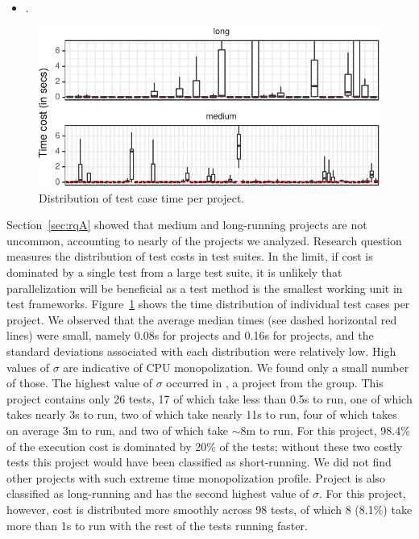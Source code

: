 \begin{itemize}
  \item \numRQFeasibilityTwo. \textbf{\RQFeasibilityTwo}
\end{itemize}

\begin{figure}[t!]
  \centering
  \includegraphics[width=.48\textwidth]{results/testcost-distribution.pdf}
  \vspace{-2mm}
  \caption{\label{fig:time-distributions}Distribution of test case time per project.}%
  \vspace{-5mm}
\end{figure}

Section~\ref{sec:rqA} showed that medium and long-running projects are
not uncommon, accounting to nearly \percentMedLongRunning{} of the
\numSubjs{} projects we analyzed.  Research question \numRQFeasibilityTwo{}
measures the distribution of test costs in test suites.  In
the limit, if cost is dominated by a single test from a large test
suite, it is unlikely that parallelization will be beneficial as a
test method is the smallest working unit in test frameworks.
Figure~\ref{fig:time-distributions} shows the time distribution of
individual test cases per project.
We observed that the average median times (see dashed horizontal red
lines) were small, namely 0.08s
for \medg{} projects and 0.16s for \longg{} projects, and the standard deviations associated with each distribution were
relatively low. High values of
$\sigma$ are indicative of CPU monopolization. We found only a small number
of those. The highest value of $\sigma$ occurred in
, a project from the \longg{} group.
This project contains only 26 tests, 17 of which take less than 0.5s
to run, one of which takes nearly 3s to run, two of which take nearly
11s to run, four of which takes on average 3m to run, and two of which
take $\sim$8m to run.
For this project, 98.4\% of the execution cost is dominated by 20\% of
the tests; without these two costly tests this project would have been
classified as short-running.
We did not find other projects with such extreme time monopolization
profile.
Project  is also classified as
long-running and has the second highest value of $\sigma$.
For this project, however, cost is distributed more smoothly across 98
tests, of which 8 (8.1\%) take more than 1s to run with the rest of
the tests running faster.

